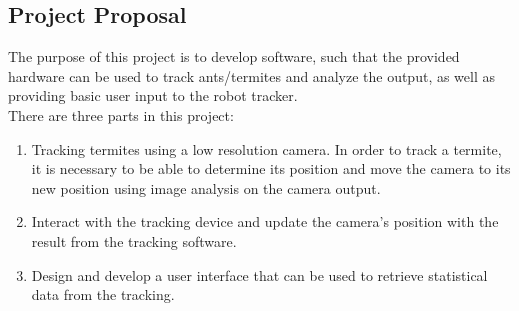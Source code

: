 
\subsection{Project Proposal}


The purpose of this project is to develop software, such that the provided hardware can be used to track ants/termites and analyze the output, as well as providing basic user input to the robot tracker. \\

There are three parts in this project:  

\begin{enumerate}
\item Tracking termites using a low resolution camera. In order to track a termite, it is necessary to be able to determine its position and move the camera to its new position using image analysis on the camera output. 

\item Interact with the tracking device and update the camera's position with the result from the tracking software. 

\item Design and develop a user interface that can be used to retrieve statistical data from the tracking.  
\end{enumerate}